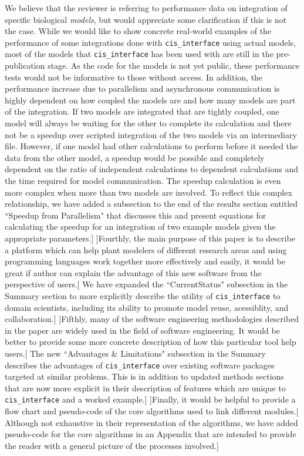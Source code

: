 \documentclass[11pt]{article}
\newcommand{\pkg}{{\tt cis\_interface}{}}
\newcommand{\cmark}{\ding{51}}%
\newcommand{\done}{\makebox[0pt][l]{$\square$}{\raisebox{2pt}{\large\hspace{1pt}\cmark}}%
\hspace{-2.5pt}}
\begin{document}
\begin{comments}
We believe that the reviewer is referring to performance data on integration of specific biological \emph{models}, but would appreciate some clarification if this is not the case. While we would like to show concrete real-world examples of the performance of some integrations done with {\pkg} using actual models, most of the models that {\pkg} has been used with are still in the pre-publication stage. As the code for the models is not yet public, these performance tests would not be informative to those without access. In addition, the performance increase due to parallelism and asynchronous communication is highly dependent on how coupled the models are and how many models are part of the integration. If two models are integrated that are tightly coupled, one model will always be waiting for the other to complete its calculation and there not be a speedup over scripted integration of the two models via an intermediary file. However, if one model had other calculations to perform before it needed the data from the other model, a speedup would be possible and completely dependent on the ratio of independent calculations to dependent calculations and the time required for model communication. The speedup calculation is even more complex when more than two models are involved. To reflect this complex relationship, we have added a subsection to the end of the results section entitled ``Speedup from Parallelism" that discusses this and present equations for calculating the speedup for an integration of two example models given the appropriate parameters.]
\comment[\done]{Fourthly, the main purpose of this paper is to describe a platform which can help plant modelers of different research areas and using programming languages work together more effectively and easily, it would be great if author can explain the advantage of this new software from the perspective of users.}[%
%
We have expanded the ``CurrentStatus" subsection in the Summary section to more explicitly describe the utility of {\pkg} to domain scientists, including its ability to promote model reuse, acessiblity, and collaboration.]
\comment[\done]{Fifthly,  many of the software engineering methodologies described in the paper are widely used in the field of software engineering. It would be better to provide some more concrete description of how this particular tool help users.}[%
%
The new ``Advantages \& Limitations" subsection in the Summary describes the advantages of {\pkg} over existing software packages targeted at similar problems. This is in addition to updated methods sections that are now more explicit in their description of features which are unique to {\pkg} and a worked example.]
\comment[\done]{Finally, it would be helpful to provide a flow chart and pseudo-code of the core algorithms used to link different modules.}[%
%
Although not exhaustive in their representation of the algorithms, we have added pseudo-code for the core algorithms in an Appendix that are intended to provide the reader with a general picture of the processes involved.]
\end{comments}
\end{document}
